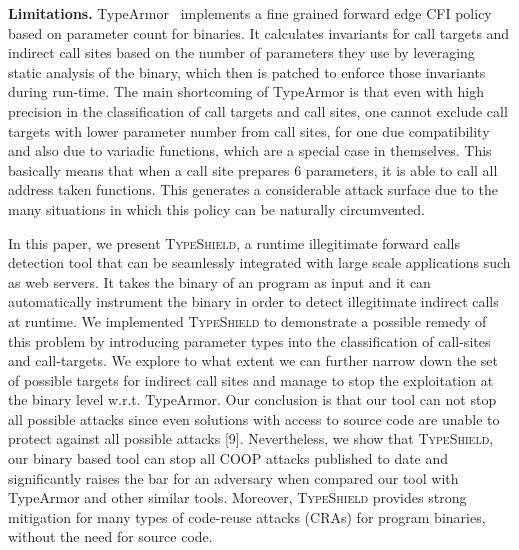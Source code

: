 \textbf{Limitations.} TypeArmor~\cite{veen:typearmor} implements a fine grained forward edge CFI 
policy based on parameter count for binaries. It calculates invariants for call targets and indirect call sites based on
the number of parameters they use by leveraging static analysis of the binary, which then is
patched to enforce those invariants during run-time. The main shortcoming of TypeArmor is that
even with high precision in the classification of 
call targets and call sites, one cannot exclude call targets with lower parameter number from 
call sites, for one due compatibility and also due to variadic functions, which are a special
case in themselves. This basically means that when a call site prepares 6 parameters, it is 
able to call all address taken functions. This generates a considerable attack surface due to the many
situations in which this policy can be naturally circumvented.

In this paper, we present \textsc{TypeShield}, a runtime illegitimate forward 
calls detection tool that can be seamlessly integrated with large scale applications such as web servers.
It takes the binary of an program as input and it can automatically instrument the binary in order
to detect illegitimate indirect calls at runtime. 
We implemented \textsc{TypeShield} to demonstrate a possible remedy of this problem by introducing
parameter types into the classification of call-sites and call-targets. We explore to
what extent we can further narrow down the set of possible targets for indirect call sites
and manage to stop the exploitation at the binary level w.r.t. TypeArmor.
Our conclusion is that our tool can not stop all possible attacks since even solutions 
with access to source code are unable to protect against all possible attacks [9].
Nevertheless, we show that \textsc{TypeShield}, our binary based tool can stop all 
COOP attacks published to date and significantly raises the bar for an adversary when compared our tool with 
TypeArmor and other similar tools. 
Moreover, \textsc{TypeShield} provides strong mitigation for many types of code-reuse attacks
(CRAs) for program binaries, without the need for source code. 

